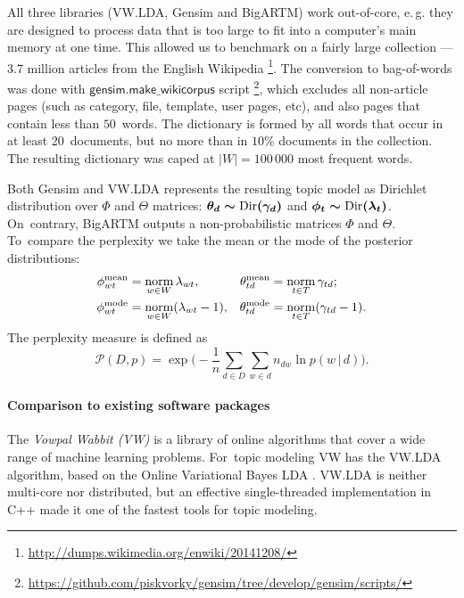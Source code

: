 \documentclass{sig-alternate}
\newcommand{\norm}{\mathop{\rm norm}\limits}
\newcommand{\cond}{\mspace{3mu}{|}\mspace{3mu}}
\newcommand{\kw}[1]{\textsf{#1}}
\begin{document}
All three libraries (VW.LDA, Gensim and BigARTM) work out-of-core,
e.\,g. they are designed to process data that is too large to fit into a computer's main memory at one time.
This allowed us to benchmark on a fairly large collection --- 3.7 million articles from the English Wikipedia%
\footnote{\url{http://dumps.wikimedia.org/enwiki/20141208/}}.
The conversion to bag-of-words was done with $\kw{gensim.make\_wikicorpus}$ script%
\footnote{\url{https://github.com/piskvorky/gensim/tree/develop/gensim/scripts/}},
which excludes all non-article pages (such as category, file, template, user pages, etc),
and also pages that contain less than $50$~words.
The dictionary is formed by all words that occur in at least 20~documents,
but no more than in $10\%$ documents in the collection.
The resulting dictionary was caped at $|W| = 100\,000$ most frequent words.

Both Gensim and VW.LDA represents the resulting topic model as Dirichlet distribution over $\Phi$ and $\Theta$ matrices:
$\boldmath{\theta}_{d} \sim \text{Dir}(\boldmath{\gamma}_d)$ and
$\boldmath{\phi}_{t} \sim \text{Dir}(\boldmath{\lambda}_t)$.
On~contrary, BigARTM outputs a non-probabilistic matrices $\Phi$ and $\Theta$.
To~compare the perplexity we take the mean or the mode of the posterior distributions:
\begin{align*}
    \phi^{\mathrm{mean}}_{wt} &= \norm_{w\in W} \lambda_{wt}, &
	\theta^{\mathrm{mean}}_{td} &= \norm_{t\in T} \gamma_{td};
\\
    \phi^{\mathrm{mode}}_{wt} &= \norm_{w\in W} (\lambda_{wt}-1), &
	\theta^{\mathrm{mode}}_{td} &= \norm_{t\in T} (\gamma_{td}-1).
\end{align*}
The perplexity measure is defined as
\begin{equation}
    \label{eq:perplexity}
    \mathscr{P}(D, p) =
        \exp \biggl( - \frac{1}{n} \sum_{d \in D} \sum_{w \in d} n_{dw} \ln p(w \cond d) \biggr).
\end{equation}

\paragraph{Comparison to existing software packages}

The \emph{Vowpal Wabbit (VW)} is a library
of online algorithms that cover a wide range of machine learning problems. %
For~topic modeling VW has the VW.LDA algorithm, based on the Online Variational Bayes LDA \cite{hoffman10online}.
VW.LDA is neither multi-core nor distributed,
but an effective single-threaded implementation in C++ made it one of the fastest tools for topic modeling.%
\end{document}
